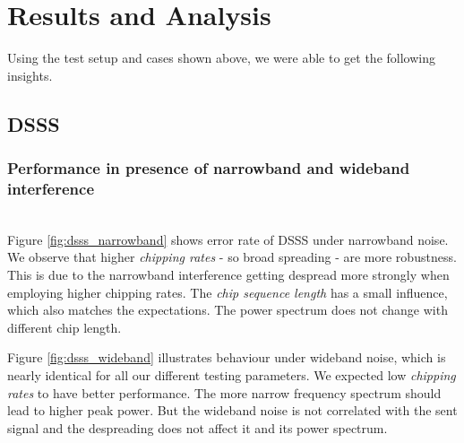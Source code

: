 \section{Results and Analysis}
	Using the test setup and cases shown above, we were able to get the following insights.
	\subsection{DSSS}
		\subsubsection{Performance in presence of narrowband and wideband interference}~\\
			Figure \ref{fig:dsss_narrowband} shows error rate of DSSS under narrowband noise. We observe that higher \emph{chipping rates} - so broad spreading - are more robustness.
			This is due to the narrowband interference getting despread more strongly when employing higher chipping rates.
			The \emph{chip sequence length} has a small influence, which also matches the expectations. The power spectrum does not change with different chip length.
			
			Figure \ref{fig:dsss_wideband} illustrates behaviour under wideband noise, which is nearly identical for all our different testing parameters.
			We expected low \emph{chipping rates} to have better performance. The more narrow frequency spectrum should lead to higher peak power. 
			But the wideband noise is not correlated with the sent signal and the despreading does not affect it and its power spectrum.
			
